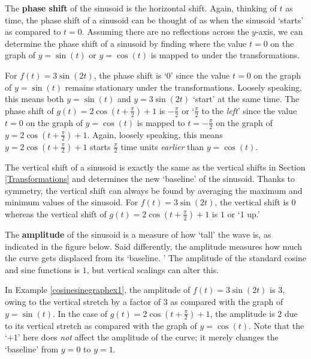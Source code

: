 \documentclass{ximera}
\begin{document}
  
  


The \textbf{phase shift} of the sinusoid is the horizontal shift. Again, thinking of $t$ as time, the phase shift of a sinusoid can be thought of as when the sinusoid `starts' as compared to $t=0$.   Assuming there are no reflections across the $y$-axis, we can determine the phase shift of a sinusoid by finding where the value $t=0$ on the graph of $y = \sin(t)$ or $y=\cos(t)$ is mapped to under the transformations.  




For $f(t) = 3 \sin(2t)$, the phase shift is `$0$' since the value $t=0$ on the graph of $y = \sin(t)$ remains stationary under the transformations. Loosely speaking, this means both $y=\sin(t)$ and $y=3\sin(2t)$ `start' at the same time.  The phase shift of  $g(t) = 2 \cos\left(t +\frac{\pi}{2} \right) +1$ is $-\frac{\pi}{2}$ or `$\frac{\pi}{2}$ to the \textit{left}' since the value $t = 0$ on the graph of $y=\cos(t)$ is mapped to $t = -\frac{\pi}{2}$ on the graph of $y= 2 \cos\left(t +\frac{\pi}{2} \right) +1$.  Again, loosely speaking, this means $y=2 \cos\left(t +\frac{\pi}{2} \right) +1$ starts $\frac{\pi}{2}$ time units \textit{earlier} than $y=\cos(t)$.

  
  


 The vertical shift of a sinusoid is exactly the same as the vertical shifts in Section \ref{Transformations} and determines the new `baseline' of the sinusoid.  Thanks to symmetry, the vertical shift can always be found by averaging the maximum and minimum values of the sinusoid.  For $f(t) = 3 \sin(2t)$, the vertical shift is $0$ whereas the vertical shift of $g(t) = 2 \cos\left(t +\frac{\pi}{2} \right) +1$ is $1$ or `$1$ up.'






The \textbf{amplitude} of the sinusoid is a measure of how `tall' the wave is, as indicated in the figure below.  Said differently, the amplitude measures how much the curve gets displaced from its `baseline. ' The amplitude of the standard cosine and sine functions is $1$, but vertical scalings can alter this. 




 In  Example \ref{cosinesinegraphex1}, the amplitude of $f(t) = 3 \sin(2t)$ is $3$, owing to the vertical stretch by a factor of $3$ as compared with the graph of $y = \sin(t)$.  In the case of $g(t) = 2 \cos\left(t +\frac{\pi}{2} \right) +1$, the amplitude is $2$ due to its vertical stretch as compared with the graph of $y = \cos(t)$. Note that the `$+1$' here does \textit{not} affect the amplitude of the curve;  it merely changes  the `baseline' from $y=0$ to $y=1$.
\end{document}
